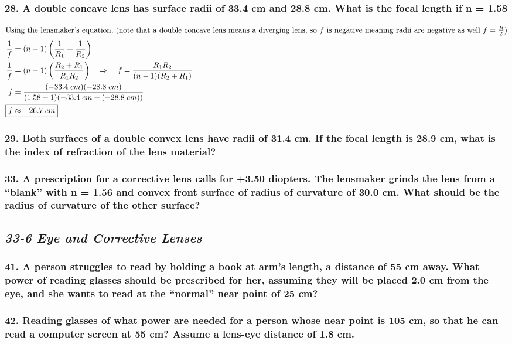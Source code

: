 \documentclass{article}
\newcommand\rr{\quad\Rightarrow\quad}
\newcommand{\bp}[1]{\left(#1\right)}
\begin{document}
\subsubsection*{
    28. A double concave lens has surface radii of 33.4 cm and 28.8 cm. What is the focal length if n = 1.58
}
\begin{align*}
    \intertext{Using the lensmaker's equation, (note that a double concave lens
    means a diverging lens, so $f$ is negative meaning radii are negative as well
    $f=\frac R 2$)}
    \frac 1 f &= (n-1)\bp{\frac 1 {R_1} + \frac 1 {R_2}} \\
    \frac 1 f &= (n-1)\bp{\frac{R_2 + R_1}{R_1R_2}} \rr f =
    \frac{R_1R_2}{(n-1)(R_2+R_1)} \\
    f &= \frac{(-33.4\;cm)(-28.8\;cm)}{(1.58-1)(-33.4\;cm+(-28.8\;cm))} \\
    \Aboxed{f &\approx -26.7\;cm}
\end{align*}
\subsubsection*{
    29. Both surfaces of a double convex lens have radii of 31.4 cm. If the focal length is 28.9 cm, what is
    the index of refraction of the lens material?
}
\subsubsection*{
    33. A prescription for a corrective lens calls for +3.50 diopters. The lensmaker grinds the lens from a
    “blank” with n = 1.56 and convex front surface of radius of curvature of 30.0 cm. What should be the radius
    of curvature of the other surface?
}
\newpage
\begin{center}
    \subsection*{\textbf{\textit{33-6 Eye and Corrective Lenses}}}
\end{center}
\subsubsection*{
    41. A person struggles to read by holding a book at arm’s length, a distance of 55 cm away. What power of
    reading glasses should be prescribed for her, assuming they will be placed 2.0 cm from the eye, and she
    wants to read at the “normal” near point of 25 cm?
}
\subsubsection*{
    42. Reading glasses of what power are needed for a person whose near point is 105 cm, so that he can read
    a computer screen at 55 cm? Assume a lens-eye distance of 1.8 cm.
}
\end{document}
